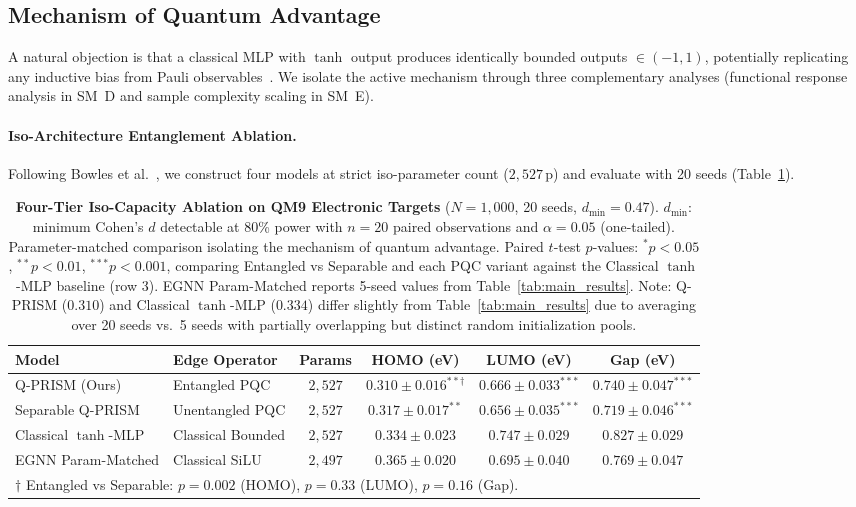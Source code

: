 \documentclass[10pt,twocolumn,letterpaper]{article}
\begin{document}
\subsection{Mechanism of Quantum Advantage}
\label{sec:mechanism}

A natural objection is that a classical MLP with $\tanh$ output produces identically bounded outputs $\in (-1, 1)$, potentially replicating any inductive bias from Pauli observables~\cite{bowles2024better}. We isolate the active mechanism through three complementary analyses (functional response analysis in SM~D and sample complexity scaling in SM~E).

\paragraph{Iso-Architecture Entanglement Ablation.}
Following Bowles et al.~\cite{bowles2024better}, we construct four models at strict iso-parameter count ($2{,}527$\,p) and evaluate with 20 seeds (Table~\ref{tab:iso_ablation}).

\begin{table}[t]
\centering
\small
\caption{\textbf{Four-Tier Iso-Capacity Ablation on QM9 Electronic Targets} ($N = 1{,}000$, 20 seeds, $d_{\min} = 0.47$). $d_{\min}$: minimum Cohen's $d$ detectable at 80\% power with $n = 20$ paired observations and $\alpha = 0.05$ (one-tailed). Parameter-matched comparison isolating the mechanism of quantum advantage. Paired $t$-test $p$-values: $^{*}p < 0.05$, $^{**}p < 0.01$, $^{***}p < 0.001$, comparing Entangled vs Separable and each PQC variant against the Classical $\tanh$-MLP baseline (row 3). EGNN Param-Matched reports 5-seed values from Table~\ref{tab:main_results}. Note: Q-PRISM ($0.310$) and Classical $\tanh$-MLP ($0.334$) differ slightly from Table~\ref{tab:main_results} due to averaging over 20 seeds vs.\ 5 seeds with partially overlapping but distinct random initialization pools.}
\label{tab:iso_ablation}
\begin{tabular}{llcccc}
\toprule
\textbf{Model} & \textbf{Edge Operator} & \textbf{Params} & \textbf{HOMO (eV)} & \textbf{LUMO (eV)} & \textbf{Gap (eV)} \\
\midrule
Q-PRISM (Ours) & Entangled PQC & $2{,}527$ & $\mathbf{0.310 \pm 0.016}^{**\dagger}$ & $0.666 \pm 0.033^{***}$ & $0.740 \pm 0.047^{***}$ \\
Separable Q-PRISM & Unentangled PQC & $2{,}527$ & $0.317 \pm 0.017^{**}$ & $\mathbf{0.656 \pm 0.035}^{***}$ & $\mathbf{0.719 \pm 0.046}^{***}$ \\
Classical $\tanh$-MLP & Classical Bounded & $2{,}527$ & $0.334 \pm 0.023$ & $0.747 \pm 0.029$ & $0.827 \pm 0.029$ \\
EGNN Param-Matched & Classical SiLU & $2{,}497$ & $0.365 \pm 0.020$ & $0.695 \pm 0.040$ & $0.769 \pm 0.047$ \\
\bottomrule
\multicolumn{6}{l}{\footnotesize $\dagger$ Entangled vs Separable: $p = 0.002$ (HOMO), $p = 0.33$ (LUMO), $p = 0.16$ (Gap).}
\end{tabular}
\end{table}
\end{document}
